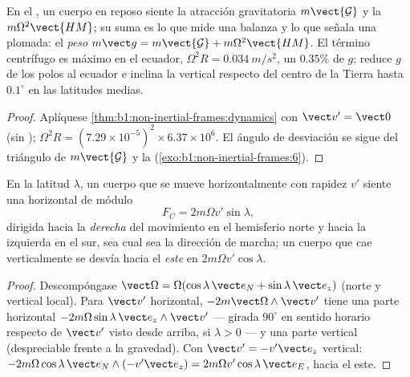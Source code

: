 \begin{proposition}\label{prop:b1:non-inertial-frames:weight}
En el , un cuerpo en reposo siente la atracción
gravitatoria $m\vect{\mathcal G}$ y la  $m\Omega^2\vect{HM}$; su
suma es lo que mide una balanza y lo que señala una plomada: el
\emph{peso} $m\vect g = m\vect{\mathcal G} + m\Omega^2\vect{HM}$. El término
centrífugo es máximo en el ecuador, $\Omega^2R = \qty{0.034}{m/s^2}$, un
$0.35\%$ de $g$; reduce $g$ de los polos al ecuador e inclina la vertical
respecto del centro de la Tierra hasta $0.1^\circ$ en las latitudes medias.
\end{proposition}

\begin{proof}
Aplíquese \cref{thm:b1:non-inertial-frames:dynamics} con $\vect v' = \vect 0$
(sin ); $\Omega^2R = (7.29\times10^{-5})^2 \times 6.37\times10^6$.
El ángulo de desviación se sigue del triángulo de $m\vect{\mathcal G}$ y la
 (\cref{exo:b1:non-inertial-frames:6}).
\end{proof}

\begin{proposition}\label{prop:b1:non-inertial-frames:coriolis}
En la latitud $\lambda$, un cuerpo que se mueve horizontalmente con
rapidez $v'$ siente una  horizontal de módulo
\[
F_C = 2m\Omega v'\sin\lambda ,
\]
dirigida hacia la \emph{derecha} del movimiento en el hemisferio norte y
hacia la izquierda en el sur, sea cual sea la dirección de marcha; un
cuerpo que cae verticalmente se desvía hacia el \emph{este} en $2m\Omega v'\cos\lambda$.
\end{proposition}

\begin{proof}
Descompóngase $\vect\Omega = \Omega(\cos\lambda\,\vect e_N + \sin\lambda\,\vect e_z)$
(norte y vertical local). Para $\vect v'$ horizontal, $-2m\vect\Omega\wedge\vect v'$
tiene una parte horizontal $-2m\Omega\sin\lambda\,\vect e_z\wedge\vect v'$ --- girada
$90^\circ$ en sentido horario respecto de $\vect v'$ visto desde arriba, si
$\lambda > 0$ --- y una parte vertical (despreciable frente a la
gravedad). Con $\vect v' =
-v'\vect e_z$ vertical: $-2m\Omega\cos\lambda\,\vect e_N\wedge(-v'\vect e_z) = 2m\Omega v'\cos\lambda\,
\vect e_E$, hacia el este.
\end{proof}

